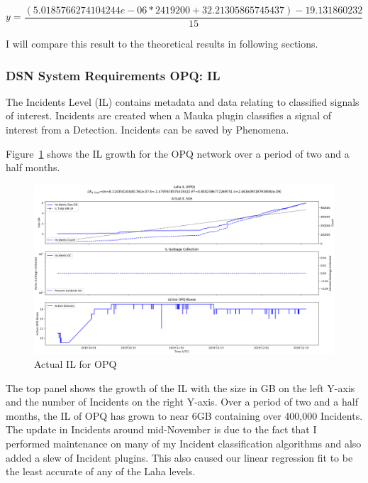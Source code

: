 \begin{equation}
    y = \frac{(5.0185766274104244e-06 * 2419200 + 32.21305865745437) - 19.131860232}{15}
    \label{eq:dl_si_ex}
\end{equation}

I will compare this result to the theoretical results in following sections.

\subsubsection{DSN System Requirements OPQ: IL}

The Incidents Level (IL) contains metadata and data relating to classified signals of interest. Incidents are created when a Mauka plugin classifies a signal of interest from a Detection. Incidents can be saved by Phenomena.

Figure~\ref{fig:actual_il_opq} shows the IL growth for the OPQ network over a period of two and a half months.

\begin{figure}[H]
    \centering
    \includegraphics[width=\linewidth]{figures/actual_il_opq.png}
    \caption{Actual IL for OPQ}
    \label{fig:actual_il_opq}
\end{figure}

The top panel shows the growth of the IL with the size in GB on the left Y-axis and the number of Incidents on the right Y-axis. Over a period of two and a half months, the IL of OPQ has grown to near 6GB containing over 400,000 Incidents. The update in Incidents around mid-November is due to the fact that I performed maintenance on many of my Incident classification algorithms and also added a slew of Incident plugins. This also caused our linear regression fit to be the least accurate of any of the Laha levels.

